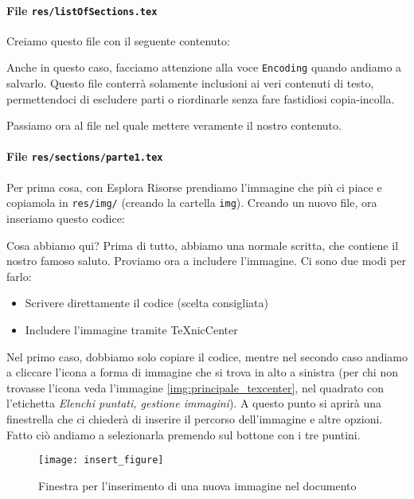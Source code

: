 \paragraph*{File \texttt{res/listOfSections.tex}} Creiamo questo file con il
seguente contenuto:



\noindent Anche in questo caso, facciamo attenzione alla voce \texttt{Encoding}
quando andiamo a salvarlo. Questo file conterrà solamente inclusioni ai veri
contenuti di testo, permettendoci di escludere parti o riordinarle senza fare
fastidiosi copia-incolla.

Passiamo ora al file nel quale mettere veramente il nostro contenuto.

\paragraph*{File \texttt{res/sections/parte1.tex}} Per prima cosa, con Esplora
Risorse prendiamo l'immagine che più ci piace e copiamola in \texttt{res/img/}
(creando la cartella \texttt{img}). Creando un nuovo file, ora inseriamo questo
codice:



\noindent Cosa abbiamo qui? Prima di tutto, abbiamo una normale scritta, che
contiene il nostro famoso saluto. Proviamo ora a includere l'immagine.
Ci sono due modi per farlo:
\begin{itemize}
 \item Scrivere direttamente il codice (scelta consigliata)
 \item Includere l'immagine tramite TeXnicCenter
\end{itemize}

Nel primo caso, dobbiamo solo copiare il codice, mentre nel secondo caso
andiamo a cliccare l'icona a forma di immagine che si trova in alto a sinistra
(per chi non trovasse l'icona veda l'immagine \ref{img:principale_texcenter},
nel quadrato con l'etichetta \textit{Elenchi puntati, gestione immagini}).
A questo punto si aprirà una finestrella che ci chiederà di inserire il
percorso dell'immagine e altre opzioni. Fatto ciò andiamo a selezionarla
premendo sul bottone con i tre puntini.

\begin{figure}[H]
 \centering
 \texttt{[image: insert\_figure]}
 \caption{Finestra per l'inserimento di una nuova immagine nel documento}
 \label{img:insert_figure}
\end{figure}

